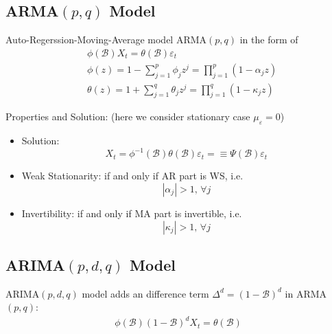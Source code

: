     

\subsection{ARMA$ (p,q) $ Model}
    Auto-Regerssion-Moving-Average model ARMA$ (p,q) $ in the form of 
    \begin{align}
        &\phi (\mathscr{B} )X_t=\theta (\mathscr{B} )\varepsilon _t\\
        &\phi (z)=1-\sum_{j=1}^p \phi _jz^j=\prod_{j=1}^p(1-\alpha _jz)\\
        &\theta (z)=1+\sum_{j=1}^q\theta _jz^j=\prod_{j=1}^q(1-\kappa _jz)
    \end{align}
    
    
    \begin{point}
        Properties and Solution: (here we consider stationary case $ \mu _\varepsilon =0 $)
    \end{point}

    \begin{itemize}[topsep=2pt,itemsep=0pt]
        \item Solution:
        \begin{equation}
            X_t=\phi ^{-1}(\mathscr{B} )\theta (\mathscr{B} )\varepsilon _t =\equiv \Psi (\mathscr{B} )\varepsilon _t
        \end{equation}
        \item Weak Stationarity: if and only if AR part is WS, i.e.
        \begin{equation}
            |\alpha _j|>1,\,\forall j 
        \end{equation}
        \item Invertibility: if and only if MA part is invertible, i.e.
        \begin{equation}
            |\kappa _j|>1,\,\forall j 
        \end{equation}
        
    \end{itemize}
    
\subsection{ARIMA$ (p,d,q) $ Model}
    ARIMA$ (p,d,q) $ model adds an difference term $ \Delta ^d=(1-\mathscr{B} )^d $ in ARMA$ (p,q) $:
    \begin{align}
        \phi (\mathscr{B} )(1-\mathscr{B} )^dX_t=\theta (\mathscr{B} )
    \end{align}
    
